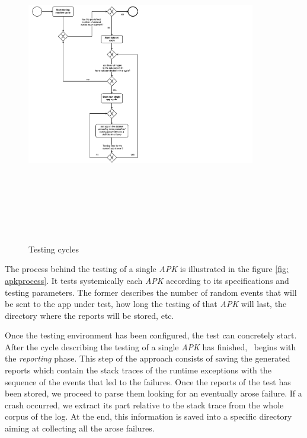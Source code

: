 \begin{figure}[tb]
\centering 
\includegraphics[width=10cm,height=14cm]{diagrams/testingapproach} 
\caption{Testing cycles}
\label{fig: testingapproach}
\end{figure}
The process behind the testing of a single \textit{APK} is illustrated in the figure \ref{fig: apkprocess}.
It tests systemically each \textit{APK} according to its specifications and testing parameters. The former describes the number of random events that will be sent to the app under test, how long the testing of that \textit{APK} will last, the directory where the reports will be stored, etc. 

Once the testing environment has been configured, the test can concretely start. 
After the cycle describing the testing of a single \textit{APK} has finished, \toolname\ begins with the \textit{reporting} phase. 
This step of the approach consists of saving the generated reports which contain the stack traces of the runtime exceptions with the sequence of the events that led to the failures. 
Once the reports of the test has been stored, we proceed to parse them looking for an eventually arose failure. If a crash occurred, we extract its part relative to the stack trace from the whole corpus of the log. At the end, this information is saved into a specific directory aiming at collecting all the arose failures.

